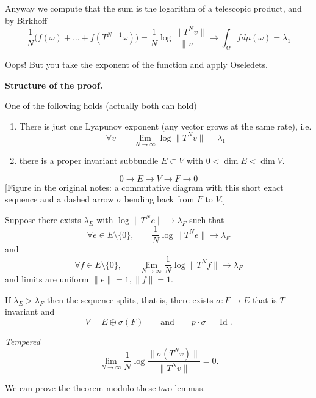 Anyway we compute that the sum is the
logarithm of a telescopic product, and by
Birkhoff
$$
\frac{1}{N}\Big(f(\omega)+\ldots+
f(T^{N-1}\omega)\Big)
=\frac{1}{N}\operatorname{log}
\frac{\|T^Nv\|}{\|v\|}
\to\int_\Omega f d \mu(\omega)=\lambda_1
$$

\medskip{}
Oops! But you take the exponent of the
function and apply Oseledets.

\medskip\noindent
{\bf Structure of the proof.}

\begin{lemma}
\label{lemma-ko-dichotomy}
One of the following holds (actually both can
hold)
\begin{enumerate}
\item There is just one Lyapunov exponent
(any vector grows at the same rate), i.e.
$$
\forall v\qquad \lim_{N \to \infty}
\operatorname{log}\|T^N v\|=\lambda_1
$$
\item there is a proper invariant subbundle
$E \subset V$ with
$0<\dim E< \dim V$.
\end{enumerate}
\end{lemma}

\begin{lemma}
\label{lemma-ko-splitting}
$$
0\to E\to V\to F\to 0
$$
[Figure in the original notes: a commutative
diagram with this short exact sequence and a
dashed arrow $\sigma$ bending back from
$F$ to $V$.]

Suppose there exists $\lambda_E$ with
$\operatorname{log} \|T^N e\|\to \lambda_F$
such that
$$
\forall e \in E\setminus\{0\},\qquad
\frac{1}{N}\operatorname{log}\|T^Ne\|
\to \lambda_F
$$
and
$$
\forall f \in E\setminus\{0\},\qquad
\lim_{N\to \infty}
\frac{1}{N}\operatorname{log}\|T^N f\|
\to \lambda_F
$$
and limits are uniform $\|e\|=1,\|f\|=1$.

If $\lambda_E > \lambda_F$ then the sequence
splits, that is, there exists
$\sigma:F \to E$ that is  $T$-invariant and
$$
V=E \oplus \sigma(F)\qquad \text{and}
\qquad p\cdot \sigma=\operatorname{Id}.
$$
\end{lemma}

\begin{definition}
\label{definition-ko-tempered}
\textit{Tempered}
$$
\lim_{N\to \infty}
\frac{1}{N}\operatorname{log}
\frac{\|\sigma(T^N v)\|}{\|T^Nv\|}=0.
$$
\end{definition}

We can prove the theorem modulo these two
lemmas.


